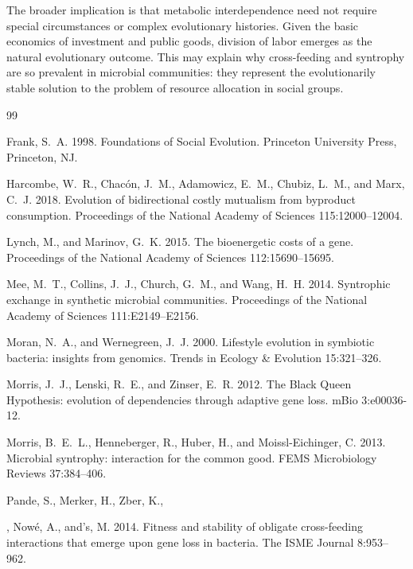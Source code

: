 \documentclass[11pt]{article}
\begin{document}
The broader implication is that metabolic interdependence need not require special circumstances or complex evolutionary histories. Given the basic economics of investment and public goods, division of labor emerges as the natural evolutionary outcome. This may explain why cross-feeding and syntrophy are so prevalent in microbial communities: they represent the evolutionarily stable solution to the problem of resource allocation in social groups.



\begin{thebibliography}{99}

Frank, S.~A. 1998. Foundations of Social Evolution. Princeton University Press, Princeton, NJ.

Harcombe, W.~R., Chac\'{o}n, J.~M., Adamowicz, E.~M., Chubiz, L.~M., and Marx, C.~J. 2018. Evolution of bidirectional costly mutualism from byproduct consumption. Proceedings of the National Academy of Sciences 115:12000--12004.

Lynch, M., and Marinov, G.~K. 2015. The bioenergetic costs of a gene. Proceedings of the National Academy of Sciences 112:15690--15695.

Mee, M.~T., Collins, J.~J., Church, G.~M., and Wang, H.~H. 2014. Syntrophic exchange in synthetic microbial communities. Proceedings of the National Academy of Sciences 111:E2149--E2156.

Moran, N.~A., and Wernegreen, J.~J. 2000. Lifestyle evolution in symbiotic bacteria: insights from genomics. Trends in Ecology \& Evolution 15:321--326.

Morris, J.~J., Lenski, R.~E., and Zinser, E.~R. 2012. The Black Queen Hypothesis: evolution of dependencies through adaptive gene loss. mBio 3:e00036-12.

Morris, B.~E.~L., Henneberger, R., Huber, H., and Moissl-Eichinger, C. 2013. Microbial syntrophy: interaction for the common good. FEMS Microbiology Reviews 37:384--406.

Pande, S., Merker, H., Zber, K.,

, Now{\'e}, A., and's, M. 2014. Fitness and stability of obligate cross-feeding interactions that emerge upon gene loss in bacteria. The ISME Journal 8:953--962.

\end{thebibliography}
\end{document}
